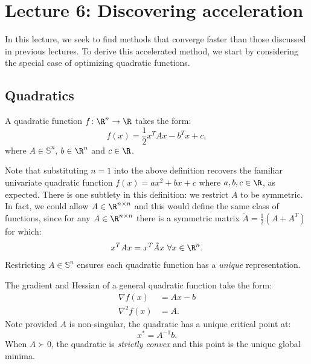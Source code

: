 \section{Lecture 6: Discovering acceleration}

In this lecture, we seek to find methods that converge faster than those discussed in previous lectures. To derive this accelerated method, we start by considering the special case of optimizing quadratic functions.

\subsection{Quadratics}

\begin{definition} A quadratic function $f\colon\R^n \to \R$ takes the form: 
\begin{equation*}
f(x) = \frac{1}{2}x^T A x - b^T x + c,
\end{equation*}
where $A \in \mathbb{S}^n$, $b \in \R^n$ and $c \in \R$.
\end{definition}

Note that substituting $n=1$ into the above definition recovers the familiar univariate quadratic function $f(x) = ax^2 + bx + c$ where $a, b, c \in \R$, as expected. There is one subtlety in this definition: we restrict $A$ to be symmetric. In fact, we could allow $A \in \R^{n \times n}$ and this would define the same class of functions, since for any $A \in \R^{n \times n}$ there is a symmetric matrix $\tilde{A} = \frac{1}{2}\left(A + A^T\right)$ for which:
\begin{equation*}
x^TAx = x^T \tilde{A} x\ \forall x \in \R^n.
\end{equation*}
Restricting $A \in \mathbb{S}^n$ ensures each quadratic function has a \textit{unique} representation.

The gradient and Hessian of a general quadratic function take the form:
\begin{align*}
\nabla f(x) &= Ax - b \\
\nabla^2 f(x) &= A.
\end{align*}
Note provided $A$ is non-singular, the quadratic has a unique critical point at:
\begin{equation*}
x^* = A^{-1}b.
\end{equation*}
When $A \succ 0$, the quadratic is \textit{strictly convex} and this point is the unique global minima.

